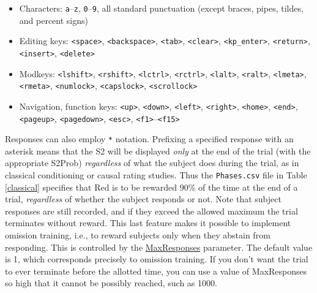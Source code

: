 \documentclass[11pt,]{article}
\begin{document}
\begin{itemize}
\item
  Characters: \texttt{a}--\texttt{z}, \texttt{0}--\texttt{9}, all
  standard punctuation (except braces, pipes, tildes, and percent signs)
\item
  Editing keys: \texttt{\textless{}space\textgreater{}},
  \texttt{\textless{}backspace\textgreater{}},
  \texttt{\textless{}tab\textgreater{}},
  \texttt{\textless{}clear\textgreater{}},
  \texttt{\textless{}kp\_enter\textgreater{}},
  \texttt{\textless{}return\textgreater{}},
  \texttt{\textless{}insert\textgreater{}},
  \texttt{\textless{}delete\textgreater{}}
\item
  Modkeys: \texttt{\textless{}lshift\textgreater{}},
  \texttt{\textless{}rshift\textgreater{}},
  \texttt{\textless{}lctrl\textgreater{}},
  \texttt{\textless{}rctrl\textgreater{}},
  \texttt{\textless{}lalt\textgreater{}},
  \texttt{\textless{}ralt\textgreater{}},
  \texttt{\textless{}lmeta\textgreater{}},
  \texttt{\textless{}rmeta\textgreater{}},
  \texttt{\textless{}numlock\textgreater{}},
  \texttt{\textless{}capslock\textgreater{}},
  \texttt{\textless{}scrollock\textgreater{}}
\item
  Navigation, function keys: \texttt{\textless{}up\textgreater{}},
  \texttt{\textless{}down\textgreater{}},
  \texttt{\textless{}left\textgreater{}},
  \texttt{\textless{}right\textgreater{}},
  \texttt{\textless{}home\textgreater{}},
  \texttt{\textless{}end\textgreater{}},
  \texttt{\textless{}pageup\textgreater{}},
  \texttt{\textless{}pagedown\textgreater{}},
  \texttt{\textless{}esc\textgreater{}},
  \texttt{\textless{}f1\textgreater{}}--\texttt{\textless{}f15\textgreater{}}
\end{itemize}

Responses can also employ \texttt{*} notation. Prefixing a specified
response with an asterisk means that the S2 will be displayed
\emph{only} at the end of the trial (with the appropriate S2Prob)
\emph{regardless} of what the subject does during the trial, as in
classical conditioning or causal rating studies. Thus the
\texttt{Phases.csv} file in Table \ref{classical} specifies that Red is
to be rewarded 90\% of the time at the end of a trial, \emph{regardless}
of whether the subject responds or not. Note that subject responses are
still recorded, and if they exceed the allowed maximum the trial
terminates without reward. This last feature makes it possible to
implement omission training, i.e., to reward subjects only when they
abstain from responding. This is controlled by the
\hyperref[maxresponses]{MaxResponses} parameter. The default value is 1,
which corresponds precisely to omission training. If you don't want the
trial to ever terminate before the allotted time, you can use a value of
MaxResponses so high that it cannot be possibly reached, such as 1000.
\end{document}

